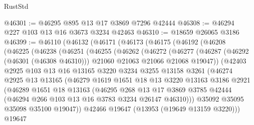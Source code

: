 \begin{lexlean}{RustStd}
\begin{coremodule}
@46301 := @46295 @895 @13 @17 @3869 @7296 @42444
@46308 := @46294 @227 @103 @13 @16 @3673 @3234 @42463
@46310 := @18659 @26065 @3186
@46399 := @46110
    (@46132
      (@46171
        (@46173
          (@46175
            (@46192
              (@46208
                (@46225
                  (@46238
                    (@46251
                      (@46255
                        (@46262
                          (@46272
                            (@46277
                              (@46287
                                (@46292 (@46301 (@46308 @46310)))
                                @21060
                                @21063
                                @21066
                                @21068
                                @19047))
                            (@42403
                              @2925
                              @103
                              @13
                              @16
                              @13165
                              @3220
                              @3234
                              @3255
                              @13158
                              @3261
                              (@46274
                                @2925
                                @13
                                @13165
                                (@46279
                                  @1619
                                  @1651
                                  @18
                                  @13
                                  @3220
                                  @13163
                                  @3186
                                  @2921
                                  (@46289
                                    @1651
                                    @18
                                    @13163
                                    (@46295
                                      @268
                                      @13
                                      @17
                                      @3869
                                      @3785
                                      @42444
                                      (@46294 @266 @103 @13 @16 @3783 @3234 @26147 @46310)))
                                  @35092
                                  @35095
                                  @35098
                                  @35100
                                  @19047))
                              @42466
                              @19647
                              (@13953 (@19649 @13159 @3220)))
                            @19647

\end{coremodule}
\end{lexlean}
